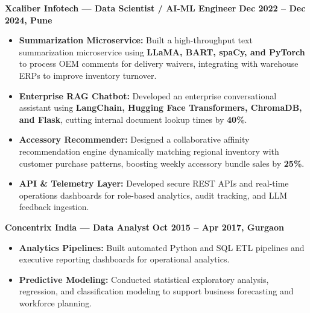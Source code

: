\documentclass[10pt,a4paper]{article}
\begin{document}
\textbf{Xcaliber Infotech --- Data Scientist / AI-ML Engineer} \hfill \textbf{Dec 2022 -- Dec 2024, Pune}
\begin{itemize}
    \item \textbf{Summarization Microservice:} Built a high-throughput text summarization microservice using \textbf{LLaMA, BART, spaCy, and PyTorch} to process OEM comments for delivery waivers, integrating with warehouse ERPs to improve inventory turnover.
    \item \textbf{Enterprise RAG Chatbot:} Developed an enterprise conversational assistant using \textbf{LangChain, Hugging Face Transformers, ChromaDB, and Flask}, cutting internal document lookup times by \textbf{40\%}.
    \item \textbf{Accessory Recommender:} Designed a collaborative affinity recommendation engine dynamically matching regional inventory with customer purchase patterns, boosting weekly accessory bundle sales by \textbf{25\%}.
    \item \textbf{API \& Telemetry Layer:} Developed secure REST APIs and real-time operations dashboards for role-based analytics, audit tracking, and LLM feedback ingestion.
\end{itemize}

\textbf{Concentrix India --- Data Analyst} \hfill \textbf{Oct 2015 -- Apr 2017, Gurgaon}
\begin{itemize}
    \item \textbf{Analytics Pipelines:} Built automated Python and SQL ETL pipelines and executive reporting dashboards for operational analytics.
    \item \textbf{Predictive Modeling:} Conducted statistical exploratory analysis, regression, and classification modeling to support business forecasting and workforce planning.
\end{itemize}

\end{document}
